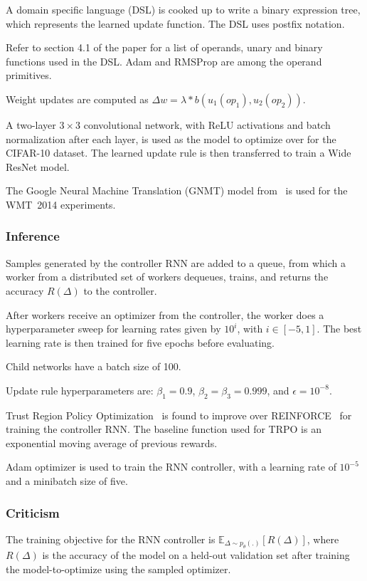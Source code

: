 \documentclass[a4paper, 12pt]{article}
\begin{document}
A domain specific language (DSL) is cooked up to write a binary expression
tree, which represents the learned update function. The DSL uses postfix
notation.

Refer to section 4.1 of the paper for a list of operands, unary and binary
functions used in the DSL\@. Adam and RMSProp are among the operand primitives.

Weight updates are computed as
$\Delta w = \lambda * b(u_1({op}_1), u_2({op}_2))$.

A two-layer $3 \times 3$ convolutional network, with ReLU activations and batch
normalization after each layer, is used as the model to optimize over for the
CIFAR-10 dataset. The learned update rule is then transferred to train a Wide
ResNet model.

The Google Neural Machine Translation (GNMT) model from~\citet{gnmt-45610} is
used for the WMT~2014 experiments.

\subsubsection{Inference}

Samples generated by the controller RNN are added to a queue, from which a
worker from a distributed set of workers dequeues, trains, and returns the
accuracy $R(\Delta)$ to the controller.

After workers receive an optimizer from the controller, the worker does a
hyperparameter sweep for learning rates given by $10^i$, with $i \in [-5, 1]$.
The best learning rate is then trained for five epochs before evaluating.

Child networks have a batch size of 100.

Update rule hyperparameters are: $\beta_1 = 0.9$, $\beta_2 = \beta_3 = 0.999$,
and $\epsilon = 10^{-8}$.

Trust Region Policy Optimization~\citet{DBLP:journals/corr/SchulmanLMJA15} is
found to improve over REINFORCE~\citet{Williams1992} for training the controller
RNN\@. The baseline function used for TRPO is an exponential moving average of
previous rewards.

Adam optimizer is used to train the RNN controller, with a learning rate of
$10^{-5}$ and a minibatch size of five.

\subsubsection{Criticism}

The training objective for the RNN controller is
$\mathbb{E}_{\Delta \sim p_\theta(.)}[R(\Delta)]$, where $R(\Delta)$ is the
accuracy of the model on a held-out validation set after training the
model-to-optimize using the sampled optimizer.
\end{document}
